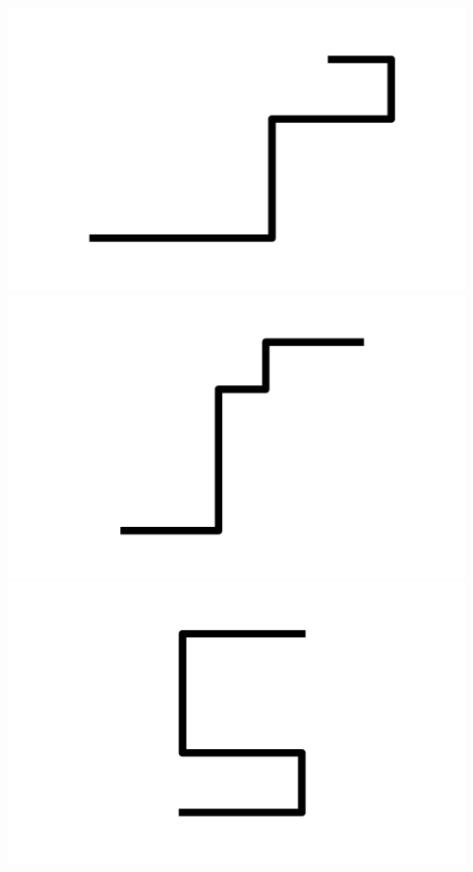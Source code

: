 \documentclass[]{report}
\begin{document}
\includegraphics[scale=.1]{pictures/21/state_cluster_shapes_442.pdf} 
\includegraphics[scale=.1]{pictures/21/state_cluster_shapes_443.pdf} 
\includegraphics[scale=.1]{pictures/21/state_cluster_shapes_444.pdf} 
\end{document}
